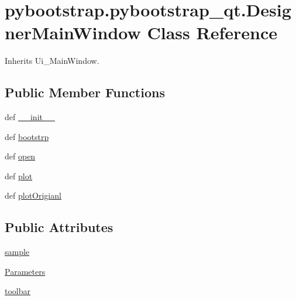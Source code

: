 \hypertarget{classpybootstrap_1_1pybootstrap__qt_1_1DesignerMainWindow}{\section{pybootstrap.\-pybootstrap\-\_\-qt.\-Designer\-Main\-Window Class Reference}
\label{classpybootstrap_1_1pybootstrap__qt_1_1DesignerMainWindow}
}


Inherits Ui\-\_\-\-Main\-Window.

\subsection*{Public Member Functions}
\begin{DoxyCompactItemize}
\item 
def \hyperlink{classpybootstrap_1_1pybootstrap__qt_1_1DesignerMainWindow_a0a3c0248bfb623dc28ec2aff411344d6}{\-\_\-\-\_\-init\-\_\-\-\_\-}
\item 
def \hyperlink{classpybootstrap_1_1pybootstrap__qt_1_1DesignerMainWindow_a9bc7183c8d81b711882d27b27c8a886a}{bootstrp}
\item 
def \hyperlink{classpybootstrap_1_1pybootstrap__qt_1_1DesignerMainWindow_a11e9f9a030d77aa8149b347894a456f2}{open}
\item 
def \hyperlink{classpybootstrap_1_1pybootstrap__qt_1_1DesignerMainWindow_a64522076d8dd5986865c9acd0b42af5d}{plot}
\item 
def \hyperlink{classpybootstrap_1_1pybootstrap__qt_1_1DesignerMainWindow_a5663542e3eed24357c8947f8c103832b}{plot\-Origianl}
\end{DoxyCompactItemize}
\subsection*{Public Attributes}
\begin{DoxyCompactItemize}
\item 
\hyperlink{classpybootstrap_1_1pybootstrap__qt_1_1DesignerMainWindow_a8779023c02f3c03aa0f50a5c823a27f2}{sample}
\item 
\hyperlink{classpybootstrap_1_1pybootstrap__qt_1_1DesignerMainWindow_aba54785800dfd17638dfe781ed28823e}{Parameters}
\item 
\hyperlink{classpybootstrap_1_1pybootstrap__qt_1_1DesignerMainWindow_ad64bb50b3c27b0371fb4a1dda77a4f41}{toolbar}
\end{DoxyCompactItemize}



